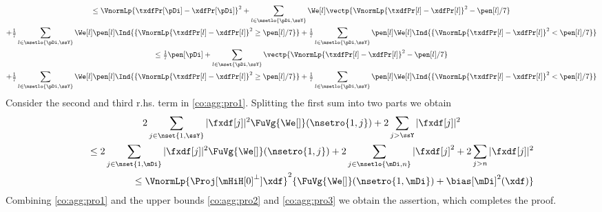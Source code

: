 \begin{pro}
\begin{multline}
\leq\VnormLp{\txdfPr[\pDi]-\xdfPr[\pDi]}^2
+\sum_{l\in\nsetlo{\pDi,\ssY}}\We[l]\vectp{\VnormLp{\txdfPr[l]-\xdfPr[l]}^2-\pen[l]/7}\\
+\tfrac{1}{7}\sum_{l\in\nsetlo{\pDi,\ssY}}\We[l]\pen[l]\Ind{\{\VnormLp{\txdfPr[l]-\xdfPr[l]}^2\geq\pen[l]/7\}}
+\tfrac{1}{7}\sum_{l\in\nsetlo{\pDi,\ssY}}\pen[l]\We[l]\Ind{\{\VnormLp{\txdfPr[l]-\xdfPr[l]}^2<\pen[l]/7\}}\\
\leq\tfrac{1}{7}\pen[\pDi]
+\sum_{l\in\nset{\pDi,\ssY}}\vectp{\VnormLp{\txdfPr[l]-\xdfPr[l]}^2-\pen[l]/7}\\
+\tfrac{1}{7}\sum_{l\in\nsetlo{\pDi,\ssY}}\We[l]\pen[l]\Ind{\{\VnormLp{\txdfPr[l]-\xdfPr[l]}^2\geq\pen[l]/7\}}
+\tfrac{1}{7}\sum_{l\in\nsetlo{\pDi,\ssY}}\pen[l]\We[l]\Ind{\{\VnormLp{\txdfPr[l]-\xdfPr[l]}^2<\pen[l]/7\}}%
\end{multline}
Consider the second and third r.hs. term in \eqref{co:agg:pro1}.  Splitting the first sum into two parts we obtain
\begin{multline}\label{co:agg:pro3}
2\sum_{j\in\nset{1,\ssY}}|\fxdf[j]|^2\FuVg{\We[]}(\nsetro{1,j})+2\sum_{j>\ssY}|\fxdf[j]|^2\\
\hspace*{5ex}\leq  2\sum_{j\in\nset{1,\mDi}}|\fxdf[j]|^2\FuVg{\We[]}(\nsetro{1,j})+ 2\sum_{j\in\nsetlo{\mDi,n}}|\fxdf[j]^2+
  2\sum_{j>n}|\fxdf[j]|^2\\\hfill
\leq \VnormLp{\Proj[{\mHiH[0]^\perp}]\xdf}^2\{\FuVg{\We[]}(\nsetro{1,\mDi})+\bias[\mDi]^2(\xdf)\}
\end{multline}
Combining  \eqref{co:agg:pro1} and the upper bounds \eqref{co:agg:pro2}
and \eqref{co:agg:pro3} we obtain   the assertion, which completes the proof.\proEnd
\end{pro}
